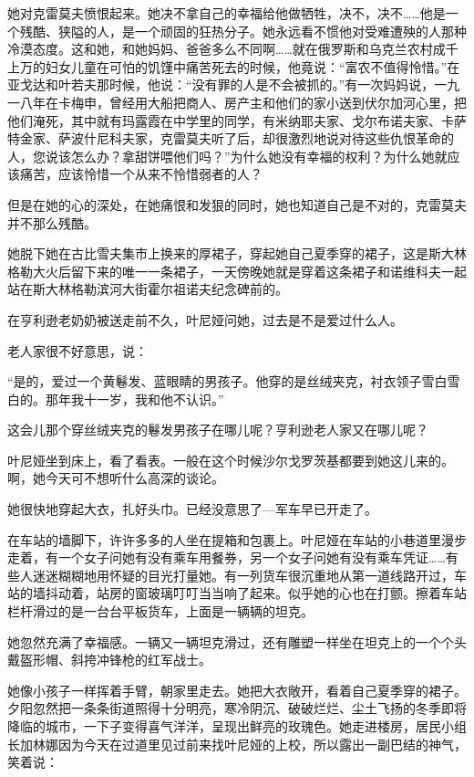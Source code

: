 她对克雷莫夫愤恨起来。她决不拿自己的幸福给他做牺牲，决不，决不……他是一个残酷、狭隘的人，是一个顽固的狂热分子。她永远看不惯他对受难遭殃的人那种冷漠态度。这和她，和她妈妈、爸爸多么不同啊……就在俄罗斯和乌克兰农村成千上万的妇女儿童在可怕的饥馑中痛苦死去的时候，他竟说：“富农不值得怜惜。”在亚戈达和叶若夫那时候，他说：“没有罪的人是不会被抓的。”有一次妈妈说，一九一八年在卡梅申，曾经用大船把商人、房产主和他们的家小送到伏尔加河心里，把他们淹死，其中就有玛露霞在中学里的同学，有米纳耶夫家、戈尔布诺夫家、卡萨特金家、萨波什尼科夫家，克雷莫夫听了后，却很激烈地说对待这些仇恨革命的人，您说该怎么办？拿甜饼喂他们吗？”为什么她没有幸福的权利？为什么她就应该痛苦，应该怜惜一个从来不怜惜弱者的人？

但是在她的心的深处，在她痛恨和发狠的同时，她也知道自己是不对的，克雷莫夫并不那么残酷。

她脱下她在古比雪夫集市上换来的厚裙子，穿起她自己夏季穿的裙子，这是斯大林格勒大火后留下来的唯一一条裙子，一天傍晚她就是穿着这条裙子和诺维科夫一起站在斯大林格勒滨河大街霍尔祖诺夫纪念碑前的。

在亨利逊老奶奶被送走前不久，叶尼娅问她，过去是不是爱过什么人。

老人家很不好意思，说：

“是的，爱过一个黄鬈发、蓝眼睛的男孩子。他穿的是丝绒夹克，衬衣领子雪白雪白的。那年我十一岁，我和他不认识。”

这会儿那个穿丝绒夹克的鬈发男孩子在哪儿呢？亨利逊老人家又在哪儿呢？

叶尼娅坐到床上，看了看表。一般在这个时候沙尔戈罗茨基都要到她这儿来的。啊，她今天可不想听什么高深的谈论。

她很快地穿起大衣，扎好头巾。已经没意思了—军车早已开走了。

在车站的墙脚下，许许多多的人坐在提箱和包裹上。叶尼娅在车站的小巷道里漫步走着，有一个女子问她有没有乘车用餐券，另一个女子问她有没有乘车凭证……有些人迷迷糊糊地用怀疑的目光打量她。有一列货车很沉重地从第一道线路开过，车站的墙抖动着，站房的窗玻璃叮叮当当响了起来。似乎她的心也在打颤。擦着车站栏杆滑过的是一台台平板货车，上面是一辆辆的坦克。

她忽然充满了幸福感。一辆又一辆坦克滑过，还有雕塑一样坐在坦克上的一个个头戴盔形帽、斜挎冲锋枪的红军战士。

她像小孩子一样挥着手臂，朝家里走去。她把大衣敞开，看着自己夏季穿的裙子。夕阳忽然把一条条街道照得十分明亮，寒冷阴沉、破破烂烂、尘土飞扬的冬季即将降临的城市，一下子变得喜气洋洋，呈现出鲜亮的玫瑰色。她走进楼房，居民小组长加林娜因为今天在过道里见过前来找叶尼娅的上校，所以露出一副巴结的神气，笑着说：

